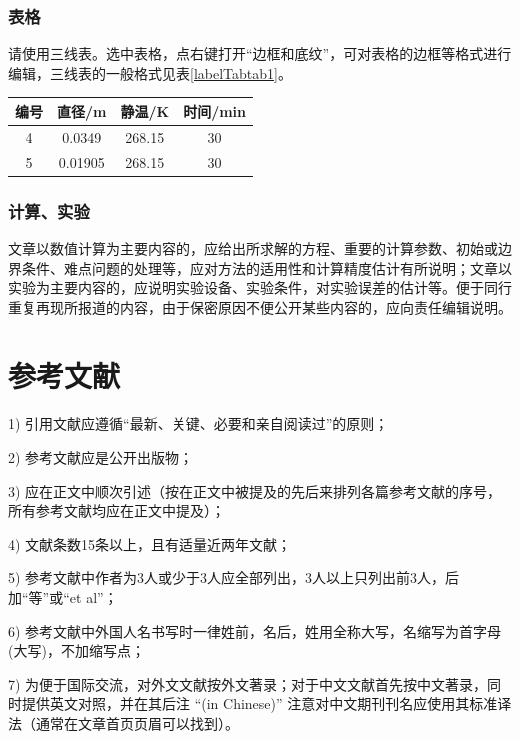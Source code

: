 \documentclass[10.5pt,twocolumn]{jthu-st}
\begin{document}
\subsubsection{表格}
请使用三线表。选中表格，点右键打开``边框和底纹”，可对表格的边框等格式进行编辑，三线表的一般格式见表\ref{labelTabtab1}。
\begin{table}[h]
\centering
\captionnamefont{\xiaowuhao\bf }
\captiontitlefont{\xiaowuhao\bf }
\renewcommand\tabcolsep{1em}
\begin{tabular}{cccc}
\toprule
{编号} &  {直径}/\si{\metre} & {静温}/\si{\kelvin} & {时间}/min\\
\midrule 
4 & 0.0349 & 268.15 & 30\\
5 & 0.01905 & 268.15 & 30\\
\bottomrule
\end{tabular}
\end{table}

\subsubsection{计算、实验}
文章以数值计算为主要内容的，应给出所求解的方程、重要的计算参数、初始或边界条件、难点问题的处理等，应对方法的适用性和计算精度估计有所说明；文章以实验为主要内容的，应说明实验设备、实验条件，对实验误差的估计等。便于同行重复再现所报道的内容，由于保密原因不便公开某些内容的，应向责任编辑说明。

\section{参考文献}
1) 引用文献应遵循``最新、关键、必要和亲自阅读过”的原则；

2) 参考文献应是公开出版物；

3) 应在正文中顺次引述（按在正文中被提及的先后来排列各篇参考文献的序号，所有参考文献均应在正文中提及）；

4) 文献条数15条以上，且有适量近两年文献；

5) 参考文献中作者为3人或少于3人应全部列出，3人以上只列出前3人，后加``等”或``et al”；

6) 参考文献中外国人名书写时一律姓前，名后，姓用全称大写，名缩写为首字母(大写)，不加缩写点；

7) 为便于国际交流，对外文文献按外文著录；对于中文文献首先按中文著录，同时提供英文对照，并在其后注 ``(in Chinese)” 注意对中文期刊刊名应使用其标准译法（通常在文章首页页眉可以找到）。
\end{document}
